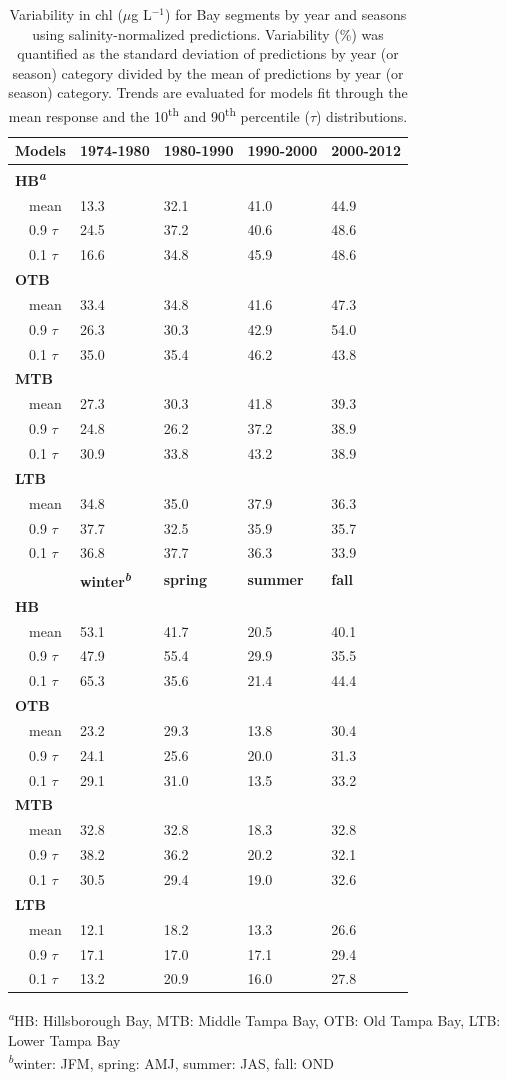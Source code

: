 \documentclass{svjour3}\usepackage[]{graphicx}\usepackage[]{color}
\newcommand{\mugl}{$\mu$g L$^{-1}$}
\begin{document}
\begin{table}[!tbp]
\caption{Variability in \ac{chl} (\mugl) for Bay segments by year and seasons using salinity-normalized predictions.  Variability (\%) was quantified as the standard deviation of predictions by year (or season) category divided by the mean of predictions by year (or season) category.  Trends are evaluated for models fit through the mean response and the 10\textsuperscript{th} and 90\textsuperscript{th} percentile ($\tau$) distributions.\label{tab:nrmcv}} 
\begin{center}
\begin{tabular}{lllll}
\hline\hline
\multicolumn{1}{l}{{\bf Models}}&\multicolumn{1}{c}{{\bf 1974-1980}}&\multicolumn{1}{c}{{\bf 1980-1990}}&\multicolumn{1}{c}{{\bf 1990-2000}}&\multicolumn{1}{c}{{\bf 2000-2012}}\tabularnewline
\hline
{\bfseries HB\textsuperscript{\textit{a}}}&&&&\tabularnewline
~~mean&13.3&32.1&41.0&44.9\tabularnewline
~~0.9 $\tau$&24.5&37.2&40.6&48.6\tabularnewline
~~0.1 $\tau$&16.6&34.8&45.9&48.6\tabularnewline
\hline
{\bfseries OTB}&&&&\tabularnewline
~~mean&33.4&34.8&41.6&47.3\tabularnewline
~~0.9 $\tau$&26.3&30.3&42.9&54.0\tabularnewline
~~0.1 $\tau$&35.0&35.4&46.2&43.8\tabularnewline
\hline
{\bfseries MTB}&&&&\tabularnewline
~~mean&27.3&30.3&41.8&39.3\tabularnewline
~~0.9 $\tau$&24.8&26.2&37.2&38.9\tabularnewline
~~0.1 $\tau$&30.9&33.8&43.2&38.9\tabularnewline
\hline
{\bfseries LTB}&&&&\tabularnewline
~~mean&34.8&35.0&37.9&36.3\tabularnewline
~~0.9 $\tau$&37.7&32.5&35.9&35.7\tabularnewline
~~0.1 $\tau$&36.8&37.7&36.3&33.9\tabularnewline
\hline
~~&{\bf winter\textsuperscript{\textit{b}}}&{\bf spring}&{\bf summer}&{\bf fall}\tabularnewline
\hline
{\bfseries HB}&&&&\tabularnewline
~~mean&53.1&41.7&20.5&40.1\tabularnewline
~~0.9 $\tau$&47.9&55.4&29.9&35.5\tabularnewline
~~0.1 $\tau$&65.3&35.6&21.4&44.4\tabularnewline
\hline
{\bfseries OTB}&&&&\tabularnewline
~~mean&23.2&29.3&13.8&30.4\tabularnewline
~~0.9 $\tau$&24.1&25.6&20.0&31.3\tabularnewline
~~0.1 $\tau$&29.1&31.0&13.5&33.2\tabularnewline
\hline
{\bfseries MTB}&&&&\tabularnewline
~~mean&32.8&32.8&18.3&32.8\tabularnewline
~~0.9 $\tau$&38.2&36.2&20.2&32.1\tabularnewline
~~0.1 $\tau$&30.5&29.4&19.0&32.6\tabularnewline
\hline
{\bfseries LTB}&&&&\tabularnewline
~~mean&12.1&18.2&13.3&26.6\tabularnewline
~~0.9 $\tau$&17.1&17.0&17.1&29.4\tabularnewline
~~0.1 $\tau$&13.2&20.9&16.0&27.8\tabularnewline
\hline
\end{tabular}\end{center}

\footnotesize \textsuperscript{\textit{a}}HB: Hillsborough Bay, MTB: Middle Tampa Bay, OTB: Old Tampa Bay, LTB: Lower Tampa Bay\\\textsuperscript{\textit{b}}winter: JFM, spring: AMJ, summer: JAS, fall: OND\end{table}
\end{document}
